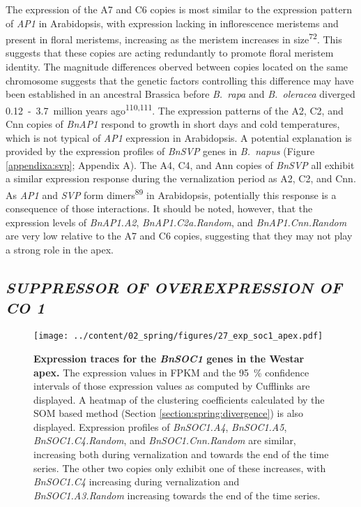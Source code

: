 \documentclass[12pt,]{book}
\begin{document}
The expression of the A7 and C6 copies is most similar to the expression
pattern of \emph{AP1} in Arabidopsis, with expression lacking in
inflorescence meristems and present in floral meristems, increasing as
the meristem increases in size\textsuperscript{72}. This suggests that
these copies are acting redundantly to promote floral meristem identity.
The magnitude differences oberved between copies located on the same
chromosome suggests that the genetic factors controlling this difference
may have been established in an ancestral Brassica before \emph{B.~rapa}
and \emph{B.~oleracea} diverged 0.12~-~3.7~million years
ago\textsuperscript{110,111}. The expression patterns of the A2, C2, and
Cnn copies of \emph{BnAP1} respond to growth in short days and cold
temperatures, which is not typical of \emph{AP1} expression in
Arabidopsis. A potential explanation is provided by the expression
profiles of \emph{BnSVP} genes in \emph{B.~napus} (Figure
\ref{appendixa:svp}; Appendix A). The A4, C4, and Ann copies of
\emph{BnSVP} all exhibit a similar expression response during the
vernalization period as A2, C2, and Cnn. As \emph{AP1} and \emph{SVP}
form dimers\textsuperscript{89} in Arabidopsis, potentially this
response is a consequence of those interactions. It should be noted,
however, that the expression levels of \emph{BnAP1.A2},
\emph{BnAP1.C2a.Random}, and \emph{BnAP1.Cnn.Random} are very low
relative to the A7 and C6 copies, suggesting that they may not play a
strong role in the apex.

\subsection{\texorpdfstring{\emph{SUPPRESSOR OF OVEREXPRESSION OF CO
1}}{SUPPRESSOR OF OVEREXPRESSION OF CO 1}}\label{section:spring:soc1}

\begin{figure}[htbp]
\centering
\texttt{[image: ../content/02\_spring/figures/27\_exp\_soc1\_apex.pdf]}
\caption{\textbf{Expression traces for the \emph{BnSOC1} genes in the
Westar apex.} The expression values in FPKM and the 95~\% confidence
intervals of those expression values as computed by Cufflinks are
displayed. A heatmap of the clustering coefficients calculated by the
SOM based method (Section \ref{section:spring:divergence}) is also
displayed. Expression profiles of \emph{BnSOC1.A4}, \emph{BnSOC1.A5},
\emph{BnSOC1.C4.Random}, and \emph{BnSOC1.Cnn.Random} are similar,
increasing both during vernalization and towards the end of the time
series. The other two copies only exhibit one of these increases, with
\emph{BnSOC1.C4} increasing during vernalization and
\emph{BnSOC1.A3.Random} increasing towards the end of the time
series.}\label{figure:227:soc1apex}
\end{figure}
\end{document}
